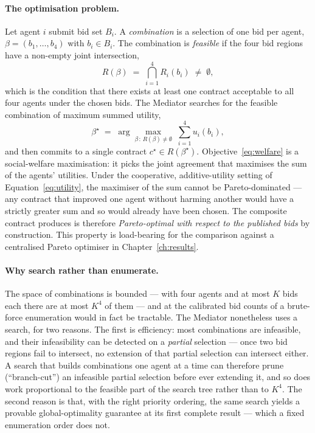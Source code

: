 \paragraph{The optimisation problem.}
Let agent $i$ submit bid set $B_i$. A \emph{combination} is a selection
of one bid per agent, $\beta = (b_1, \dots, b_4)$ with $b_i \in B_i$.
The combination is \emph{feasible} if the four bid regions have a
non-empty joint intersection,
%
\begin{equation}
  \label{eq:feasible}
  R(\beta) \;=\; \bigcap_{i=1}^{4} R_{i}(b_i) \;\neq\; \emptyset,
\end{equation}
%
which is the condition that there exists at least one contract
acceptable to all four agents under the chosen bids. The Mediator
searches for the feasible combination of maximum summed utility,
%
\begin{equation}
  \label{eq:welfare}
  \beta^{\star} \;=\; \arg\max_{\beta \,:\, R(\beta) \neq \emptyset}
                      \;\sum_{i=1}^{4} u_i(b_i),
\end{equation}
%
and then commits to a single contract $c^{\star} \in R(\beta^{\star})$.
Objective~\eqref{eq:welfare} is a social-welfare maximisation: it picks
the joint agreement that maximises the sum of the agents' utilities.
Under the cooperative, additive-utility setting of
Equation~\eqref{eq:utility}, the maximiser of the sum cannot be
Pareto-dominated --- any contract that improved one agent without
harming another would have a strictly greater sum and so would already
have been chosen. The composite contract \NEXUS{} produces is therefore
\emph{Pareto-optimal with respect to the published bids} by
construction. This property is load-bearing for the comparison against
a centralised Pareto optimiser in Chapter~\ref{ch:results}.

\paragraph{Why search rather than enumerate.}
The space of combinations is bounded --- with four agents and at most
$K$ bids each there are at most $K^4$ of them --- and at the
calibrated bid counts of \NEXUS{} a brute-force enumeration would in
fact be tractable. The Mediator nonetheless uses a search, for two
reasons. The first is efficiency: most combinations are infeasible, and
their infeasibility can be detected on a \emph{partial} selection ---
once two bid regions fail to intersect, no extension of that partial
selection can intersect either. A search that builds combinations one
agent at a time can therefore prune (``branch-cut'') an infeasible
partial selection before ever extending it, and so does work
proportional to the feasible part of the search tree rather than to
$K^4$. The second reason is that, with the right priority ordering, the
same search yields a provable global-optimality guarantee at its first
complete result --- which a fixed enumeration order does not.

